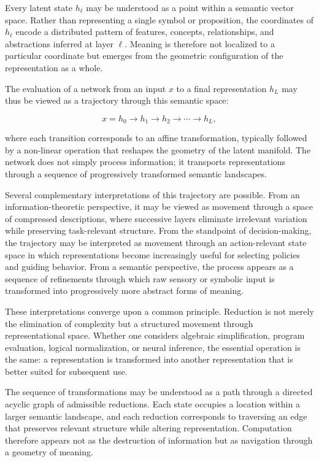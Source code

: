 \documentclass[12pt,letterpaper]{article}
\theoremstyle{remark}
\begin{document}
Every latent state $h_\ell$ may be understood as a point within a semantic vector space. Rather than representing a single symbol or proposition, the coordinates of $h_\ell$ encode a distributed pattern of features, concepts, relationships, and abstractions inferred at layer $\ell$. Meaning is therefore not localized to a particular coordinate but emerges from the geometric configuration of the representation as a whole.

The evaluation of a network from an input $x$ to a final representation $h_L$ may thus be viewed as a trajectory through this semantic space:

\[
x = h_0 \to h_1 \to h_2 \to \cdots \to h_L,
\]

where each transition corresponds to an affine transformation, typically followed by a non-linear operation that reshapes the geometry of the latent manifold. The network does not simply process information; it transports representations through a sequence of progressively transformed semantic landscapes.

Several complementary interpretations of this trajectory are possible. From an information-theoretic perspective, it may be viewed as movement through a space of compressed descriptions, where successive layers eliminate irrelevant variation while preserving task-relevant structure. From the standpoint of decision-making, the trajectory may be interpreted as movement through an action-relevant state space in which representations become increasingly useful for selecting policies and guiding behavior. From a semantic perspective, the process appears as a sequence of refinements through which raw sensory or symbolic input is transformed into progressively more abstract forms of meaning.

These interpretations converge upon a common principle. Reduction is not merely the elimination of complexity but a structured movement through representational space. Whether one considers algebraic simplification, program evaluation, logical normalization, or neural inference, the essential operation is the same: a representation is transformed into another representation that is better suited for subsequent use.

The sequence of transformations may be understood as a path through a directed acyclic graph of admissible reductions. Each state occupies a location within a larger semantic landscape, and each reduction corresponds to traversing an edge that preserves relevant structure while altering representation. Computation therefore appears not as the destruction of information but as navigation through a geometry of meaning.
\end{document}
